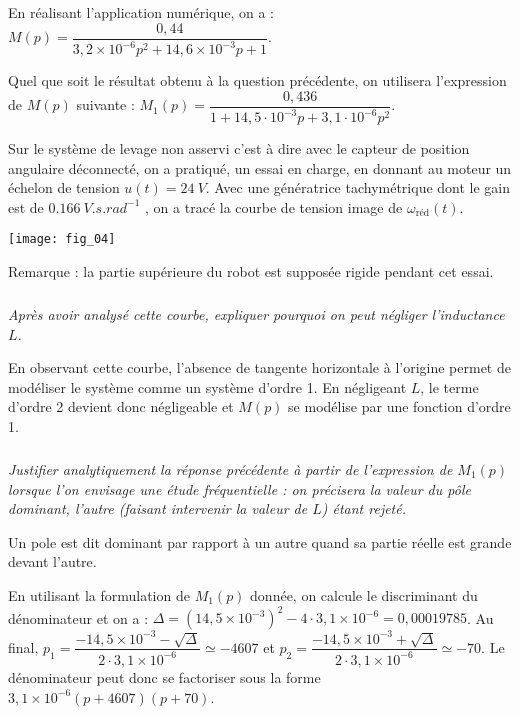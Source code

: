 \begin{multicols}{2}
\begin{corrige}
En réalisant l'application numérique, on a : 
$M(p)=\dfrac{0,44}{  3,2\times 10^{-6} p^2 +14,6\times 10^{-3}p +1 }$.

\end{corrige}
\else
\fi

Quel que soit le résultat obtenu à la question précédente, on utilisera l’expression de $M(p)$ suivante : $M_1(p)=\dfrac{0,436}{1+14,5\cdot 10^{-3}p+3,1\cdot 10^{-6}p^2}$. 

Sur le système de levage non asservi c’est à dire avec le capteur de position angulaire déconnecté, on a pratiqué, un essai en charge, en donnant au moteur un échelon de tension $u(t) = \SI{24}{V}$. 
Avec une génératrice tachymétrique dont le gain est de $\SI{0,166}{V.s.rad^{-1}}$ , on a tracé la courbe de tension image de $\omega_{\text{réd}}(t)$.  

\begin{center}
\texttt{[image: fig\_04]}
\end{center}


Remarque : la partie supérieure du robot est supposée rigide pendant cet essai.


\subparagraph{}\textit{Après avoir analysé cette courbe, expliquer pourquoi on peut négliger l’inductance $L$.}
\ifprof
\begin{corrige}
En observant cette courbe, l'absence de tangente horizontale à l'origine permet de modéliser le système comme un système d'ordre 1.  En négligeant $L$, le terme d'ordre 2 devient donc négligeable et $M(p)$ se modélise par une fonction d'ordre 1. 
\end{corrige}
\else
\fi


\subparagraph{}\textit{Justifier analytiquement la réponse précédente à partir de l’expression de $M_1(p)$ lorsque l’on envisage une étude fréquentielle : on précisera la valeur du pôle dominant, l’autre (faisant intervenir la valeur de $L$) étant rejeté.}
\begin{remarque}
Un pole est dit dominant par rapport à un autre quand sa partie réelle est grande devant l'autre.
\end{remarque}

\ifprof
\begin{corrige}
En utilisant la formulation de $M_1(p)$ donnée, on calcule le discriminant du dénominateur et on a : 
$\Delta = \left(14,5\times 10^{-3}\right)^2 - 4\cdot 3,1 \times 10^{-6} = 0,00019785 $. 
Au final, $p_1 = \dfrac{-14,5\times 10^{-3}-\sqrt{\Delta}}{2\cdot 3,1 \times 10^{-6}}\simeq -4607$ et $p_2 = \dfrac{-14,5\times 10^{-3}+\sqrt{\Delta}}{2\cdot 3,1 \times 10^{-6}}\simeq -70$. 
Le dénominateur peut donc se factoriser sous la forme $ 3,1 \times 10^{-6}\left( p + 4607\right)\left(p+70\right)$.


\end{corrige}
\end{multicols}
